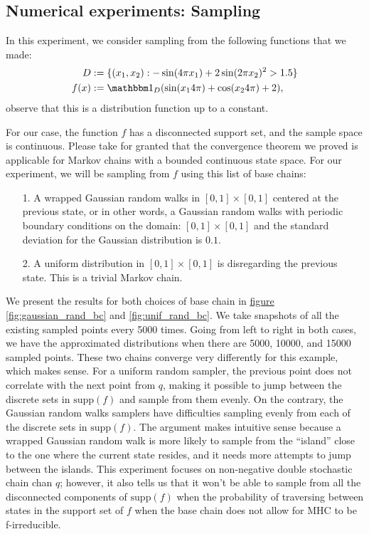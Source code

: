 \documentclass[]{article}
\theoremstyle{definition}
\begin{document}
    \subsection{Numerical experiments: Sampling}
        In this experiment, we consider sampling from the following functions that we made: 
        \begin{align*}
            D &:= \{(x_1, x_2): -\sin(4\pi x_1) + 2\sin(2\pi x_2)^2 > 1.5\}
            \\
            f(x) &:= \mathbbm 1_D (\sin(x_14\pi) + \cos(x_24\pi) + 2), 
        \end{align*}
        observe that this is a distribution function up to a constant. 
        \par
        For our case, the function $f$ has a disconnected support set, and the sample space is continuous. Please take for granted that the convergence theorem we proved is applicable for Markov chains with a bounded continuous state space. For our experiment, we will be sampling from $f$ using this list of base chains: 
        \begin{itemize}
            \item [1.] A wrapped Gaussian random walks in $[0, 1]\times [0, 1]$ centered at the previous state, or in other words, a Gaussian random walks with periodic boundary conditions on the domain: $[0, 1]\times[0, 1]$ and the standard deviation for the Gaussian distribution is $0.1$. 
            \item [2.] A uniform distribution in $[0, 1]\times [0, 1]$ is disregarding the previous state. This is a trivial Markov chain. 
        \end{itemize}
        We present the results for both choices of base chain in \hyperref[fig:gaussian_rand_bc]{figure \ref*{fig:gaussian_rand_bc}} and \hyperref[fig:unif_rand_bc]{\ref*{fig:unif_rand_bc}}. We take snapshots of all the existing sampled points every 5000 times. Going from left to right in both cases, we have the approximated distributions when there are 5000, 10000, and 15000 sampled points. These two chains converge very differently for this example, which makes sense. For a uniform random sampler, the previous point does not correlate with the next point from $q$, making it possible to jump between the discrete sets in $\text{supp}(f)$ and sample from them evenly. On the contrary, the Gaussian random walks samplers have difficulties sampling evenly from each of the discrete sets in $\text{supp}(f)$. The argument makes intuitive sense because a wrapped Gaussian random walk is more likely to sample from the ``island'' close to the one where the current state resides, and it needs more attempts to jump between the islands. This experiment focuses on non-negative double stochastic chain chan $q$; however, it also tells us that it won't be able to sample from all the disconnected components of $\text{supp}(f)$ when the probability of traversing between states in the support set of $f$ when the base chain does not allow for MHC to be f-irreducible. 
\end{document}
